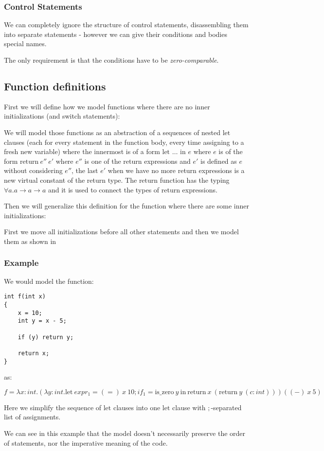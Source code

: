 \subsubsection{Control Statements}

We can completely ignore the structure of control statements, disassembling them into separate statements - however we can give their conditions and bodies special names.

The only requirement is that the conditions have to be \emph{zero-comparable}. %

\subsection{Function definitions}

First we will define how we model functions where there are no inner initializations (and switch statements):

We will model those functions as an abstraction of a sequences of nested $\text{let}$ clauses (each for every statement in the function body, every time assigning to a fresh new variable) where the innermost is of a form $\text{let } \dots \text{ in } e$ where $e$ is of the form $\text{return}\ e''\ e'$ where $e''$ is one of the return expressions and $e'$ is defined as $e$ without considering $e''$, the last $e'$ when we have no more return expressions is a new virtual constant of the return type. The $\text{return}$ function has the typing $\forall a . a \rightarrow a \rightarrow a$ and it is used to connect the types of return expressions.

Then we will generalize this definition for the function where there are some inner initializations:

First we move all initializations before all other statements and then we model them as shown in %

\subsubsection{Example}

We would model the function:

\begin{lstlisting}
int f(int x)
{
	x = 10;
	int y = x - 5;

	if (y) return y;

	return x;
}
\end{lstlisting}

as:

$f = \lambda x : int . (\lambda y : int . \text{let}\ expr_1 = (=)\ x\ 10; if_1 = \text{is\_zero}\ y\ \text{in}\ \text{return}\ x\ (\text{return}\ y\ (c : int))) ((-)\ x\ 5)$

Here we simplify the sequence of $\text{let}$ clauses into one $\text{let}$ clause with $;$-separated list of assignments.

We can see in this example that the model doesn't necessarily preserve the order of statements, nor the imperative meaning of the code.
